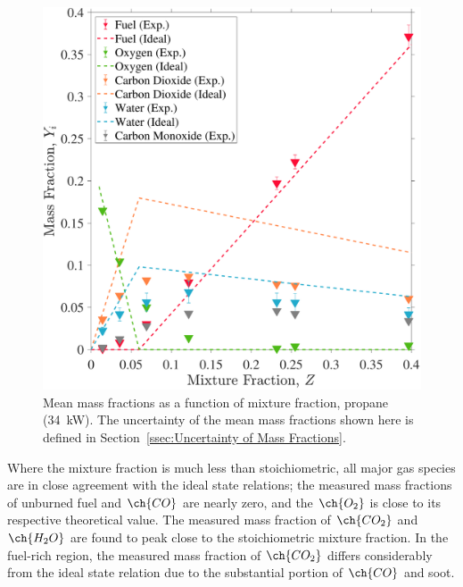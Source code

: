 \documentclass[12pt]{article}
\begin{document}
\begin{figure}[!]
	\centering
\includegraphics[width=\textwidth,keepaspectratio]{Adjusted_FuelPropane 34KW_Mixture_Fraction_Intermediate_Plot.pdf}
	\caption[Mean mass fractions as a function of mixture fraction, propane (34~kW)]{Mean mass fractions as a function of mixture fraction, propane (34~kW). The uncertainty of the mean mass fractions shown here is defined in Section~\ref{ssec:Uncertainty of Mass Fractions}.}
	\label{fig:Propane34kW_Mix_Frac}
\end{figure}

Where the mixture fraction is much less than stoichiometric, all major gas species are in close agreement with the ideal state relations; the measured mass fractions of unburned fuel and $\ch{CO}$ are nearly zero, and the $\ch{O_2}$ is close to its respective theoretical value. The measured mass fraction of $\ch{CO_{2}}$ and $\ch{H_{2}O}$ are found to peak close to the stoichiometric mixture fraction. In the fuel-rich region, the measured mass fraction of $\ch{CO_{2}}$ differs considerably from the ideal state relation due to the substantial portion of $\ch{CO}$ and soot.


\clearpage
\end{document}
